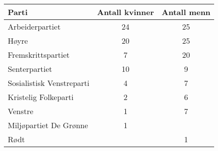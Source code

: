 %


\Oppgave[4]

\begin{table}[H]
  \centering
  \caption{}
  \begin{tabularx}{\textwidth}{| X | *{2}{S[table-format=2.0]|}}
    \Rowcolor
    Parti  \headerstrut & {Antall kvinner} & {Antall menn} \\ \hline
    Arbeiderpartiet           &        24        &      25 \\ \hline
    Høyre                     &        20        &      25 \\ \hline
    Fremskrittspartiet        &         7        &      20 \\ \hline
    Senterpartiet             &        10        &       9 \\ \hline
    Sosialistisk Venstreparti &         4        &       7 \\ \hline
    Kristelig Folkeparti      &         2        &       6 \\ \hline
    Venstre                   &         1        &       7 \\ \hline
    Miljøpartiet De Grønne    &         1        &         \\ \hline
    Rødt                      &                  &       1 \\ \hline
  \end{tabularx}
  \label{tab:del-1-oppgave-2.1}
\end{table}

